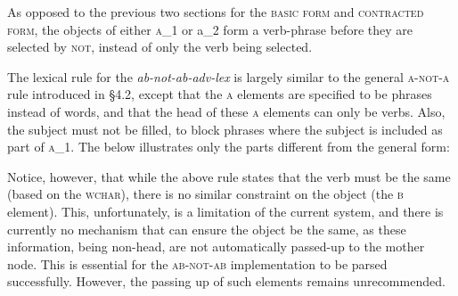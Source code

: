 \documentclass[12pt, UTF8]{article}
\begin{document}
As opposed to the previous two sections for the \textsc{basic form} and \textsc{contracted form}, the objects of either \textsc{a_1} or {a_2} form a verb-phrase before they are selected by \textsc{not}, instead of only the verb being selected.

The lexical rule for the \textit{ab-not-ab-adv-lex} is largely similar to the general \textsc{a-not-a} rule introduced in \S 4.2, except that the \textsc{a} elements are specified to be phrases instead of words, and that the head of these \textsc{a} elements can only be verbs. Also, the subject must not be filled, to block phrases where the subject is included as part of \textsc{a_1}. The below illustrates only the parts different from the general form:

\begin{exe}
\ex{
\begin{avm}
	[\tp{ab-not-ab-adv-lex}\\
		SYMSEM & [
					COMPS & < 
						[ 
						\tp{phrase}\\ 
						POS & verb ~ \\
							SUBJ & @1 
					 ] > \\ %
					MOD & < 
						[ 	
							\tp{phrase}\\ 
								POS & verb \\
								SUBJ & @1 ~ < ~[ ~ ] ~ > ~ 
						] >
		
		] %
	]
\end{avm}
}
\end{exe}

Notice, however, that while the above rule states that the verb must be the same (based on the \textsc{wchar}), there is no similar constraint on the object (the \textsc{b} element). This, unfortunately, is a limitation of the current system, and there is currently no mechanism that can ensure the object be the same, as these information, being non-head, are not automatically passed-up to the mother node. This is essential for the \textsc{ab-not-ab} implementation to be parsed successfully. However, the passing up of such elements remains unrecommended.

\end{document}
